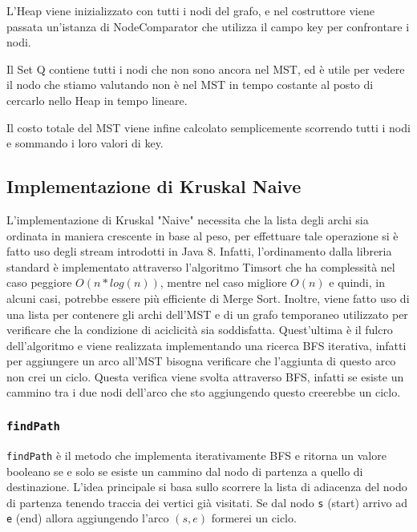 L'Heap viene inizializzato con tutti i nodi del grafo, e nel costruttore viene passata un'istanza di NodeComparator che utilizza il campo key per confrontare i nodi.

Il Set Q contiene tutti i nodi che non sono ancora nel MST, ed è utile per vedere il nodo che stiamo valutando non è nel MST in tempo costante al posto di cercarlo nello Heap in tempo lineare.

Il costo totale del MST viene infine calcolato semplicemente scorrendo tutti i nodi e sommando i loro valori di key.
\subsection{Implementazione di Kruskal Naive}
L'implementazione di Kruskal "Naive" necessita che la lista degli archi sia ordinata in maniera crescente in base al peso, per effettuare tale operazione si è fatto uso degli stream introdotti in Java 8. Infatti, l'ordinamento dalla libreria standard è implementato attraverso l'algoritmo Timsort che ha complessità  nel caso peggiore $O(n \ast log(n))$, mentre nel caso migliore $O(n)$ e quindi, in alcuni casi, potrebbe essere più efficiente di Merge Sort. Inoltre, viene fatto uso di una lista per contenere gli archi dell'MST e di un grafo temporaneo utilizzato per verificare che la condizione di aciclicità sia soddisfatta. Quest'ultima è il fulcro dell'algoritmo e viene realizzata implementando una ricerca BFS iterativa, infatti per aggiungere un arco all'MST bisogna verificare che l'aggiunta di questo arco non crei un ciclo. Questa verifica viene svolta attraverso BFS, infatti se esiste un cammino tra i due nodi dell'arco che sto aggiungendo questo creerebbe un ciclo.
\subsubsection{\texttt{findPath}}
\texttt{findPath} è il metodo che implementa iterativamente BFS e ritorna un valore booleano se e solo se esiste un cammino dal nodo di partenza a quello di destinazione. L'idea principale si basa sullo scorrere la lista di adiacenza del nodo di partenza tenendo traccia dei vertici già visitati. Se dal nodo \texttt{s} (start) arrivo ad \texttt{e} (end) allora aggiungendo l'arco $(s, e)$ formerei un ciclo.
